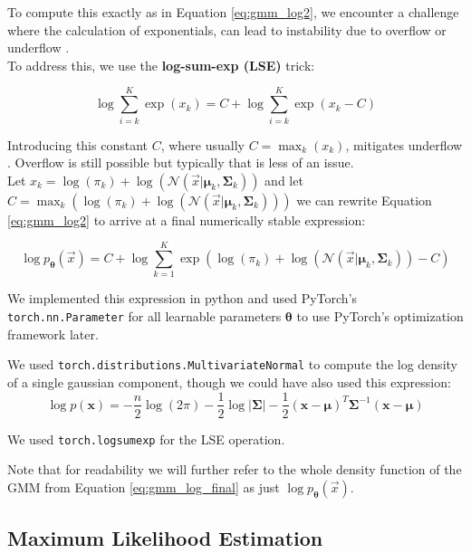 To compute this exactly as in Equation \ref{eq:gmm_log2}, we encounter a challenge where the calculation of exponentials, can lead to instability due to overflow or underflow \cite{logsumexp}. \\
To address this, we use the \textbf{log-sum-exp (LSE)} \cite{logsumexp} trick:

\[
    \log \sum_{i=k}^K \exp(x_k) = C + \log \sum_{i=k}^K \exp(x_k - C)
\]

Introducing this constant $C$, where usually $C = \max_k (x_k)$, mitigates underflow \cite{logsumexp}. Overflow is still possible 
but typically that is less of an issue. \\

Let $x_k = \log(\pi_k) + \log \left(\mathcal{N}(\vec x | \boldsymbol{\mu}_k, \boldsymbol{\Sigma}_k)\right)$ and 
let $C = \max_k \left( \log(\pi_k) + \log \left( \mathcal{N}(\vec x | \boldsymbol{\mu}_k, \boldsymbol{\Sigma}_k) \right) \right) $ we can rewrite 
Equation \ref{eq:gmm_log2} to arrive at a final numerically stable expression: 

\begin{equation}
    \log p_{\boldsymbol{\theta}}(\vec x) = C + \log \sum_{k=1}^K \exp\left( \log(\pi_k) + \log \left( \mathcal{N}(\vec x | \boldsymbol{\mu}_k, \boldsymbol{\Sigma}_k) \right) - C \right)
    \label{eq:gmm_log_final}
\end{equation}

We implemented this expression in python and used PyTorch's \cite{pytorch} \texttt{torch.nn.Parameter}
for all learnable parameters $\boldsymbol{\theta}$ to use PyTorch's optimization framework later.

We used \texttt{torch.distributions.MultivariateNormal} to compute the log density of a single 
gaussian component, though we could have also used this expression:
\begin{equation}
    \log p(\mathbf{x}) = -\frac{n}{2} \log(2\pi) - \frac{1}{2} \log |\boldsymbol{\Sigma}| - \frac{1}{2} (\mathbf{x} - \boldsymbol{\mu})^T \boldsymbol{\Sigma}^{-1} (\mathbf{x} - \boldsymbol{\mu})
\end{equation}

We used \texttt{torch.logsumexp} for the LSE operation.  

Note that for readability we will further refer to the whole density function of the GMM from Equation \ref{eq:gmm_log_final} as just 
$\log p_{\boldsymbol{\theta}}(\vec x)$.

\subsection{Maximum Likelihood Estimation}
\label{sec:gmm_mle}

